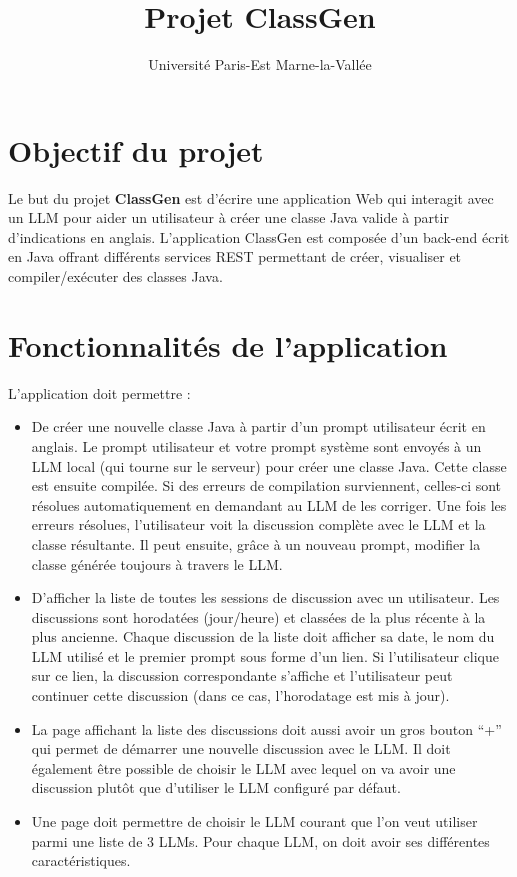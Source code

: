 \documentclass{article}
\title{Projet ClassGen}
\author{Université Paris-Est Marne-la-Vallée}
\begin{document}
\maketitle

\section{Objectif du projet}

Le but du projet \textbf{ClassGen} est d'écrire une application Web qui interagit avec un LLM pour aider un utilisateur à créer une classe Java valide à partir d'indications en anglais. L'application ClassGen est composée d'un back-end écrit en Java offrant différents services REST permettant de créer, visualiser et compiler/exécuter des classes Java.

\section{Fonctionnalités de l'application}

L'application doit permettre :
\begin{itemize}
    \item De créer une nouvelle classe Java à partir d'un prompt utilisateur écrit en anglais. Le prompt utilisateur et votre prompt système sont envoyés à un LLM local (qui tourne sur le serveur) pour créer une classe Java. Cette classe est ensuite compilée. Si des erreurs de compilation surviennent, celles-ci sont résolues automatiquement en demandant au LLM de les corriger. Une fois les erreurs résolues, l'utilisateur voit la discussion complète avec le LLM et la classe résultante. Il peut ensuite, grâce à un nouveau prompt, modifier la classe générée toujours à travers le LLM.
    \item D'afficher la liste de toutes les sessions de discussion avec un utilisateur. Les discussions sont horodatées (jour/heure) et classées de la plus récente à la plus ancienne. Chaque discussion de la liste doit afficher sa date, le nom du LLM utilisé et le premier prompt sous forme d'un lien. Si l'utilisateur clique sur ce lien, la discussion correspondante s'affiche et l'utilisateur peut continuer cette discussion (dans ce cas, l'horodatage est mis à jour).
    \item La page affichant la liste des discussions doit aussi avoir un gros bouton ``+'' qui permet de démarrer une nouvelle discussion avec le LLM. Il doit également être possible de choisir le LLM avec lequel on va avoir une discussion plutôt que d'utiliser le LLM configuré par défaut.
    \item Une page doit permettre de choisir le LLM courant que l'on veut utiliser parmi une liste de 3 LLMs. Pour chaque LLM, on doit avoir ses différentes caractéristiques.
\end{itemize}
\end{document}
